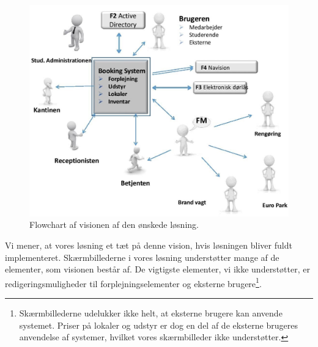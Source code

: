 \begin{figure}[h!]
  \centering
    \includegraphics[width=\textwidth]{Appendix/GUI-Prototype/DesiredFlow}
  \caption{Flowchart af visionen af den ønskede løsning\cite[s. 4]{kravspec}.}
\label{Fig:Evaluation_KS_situation_goal}
\end{figure}

Vi mener, at vores løsning et tæt på denne vision, hvis løsningen bliver fuldt implementeret. Skærmbillederne i vores løsning understøtter mange af de elementer, som visionen består af. De vigtigste elementer, vi ikke understøtter, er redigeringsmuligheder til forplejningselementer og eksterne brugere\footnote{Skærmbillederne udelukker ikke helt, at eksterne brugere kan anvende systemet. Priser på lokaler og udstyr er dog en del af de eksterne brugeres anvendelse af systemer, hvilket vores skærmbilleder ikke understøtter.}.

